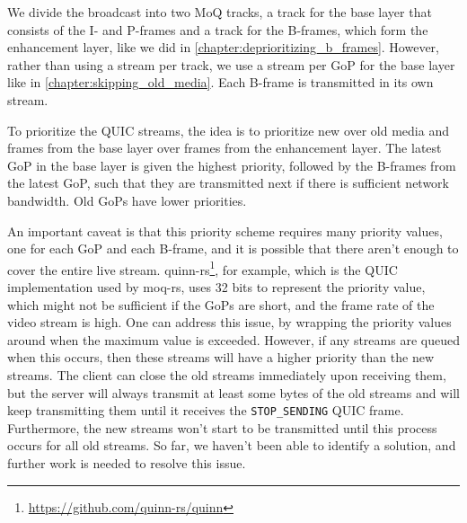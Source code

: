 We divide the broadcast into two \ac{MoQ} tracks, a track for the base layer that consists of the I- and P-frames and a track for the B-frames, which form the enhancement layer, like we did in \autoref{chapter:deprioritizing_b_frames}. However, rather than using a stream per track, we use a stream per \ac{GoP} for the base layer like in \autoref{chapter:skipping_old_media}. Each B-frame is transmitted in its own stream.

To prioritize the QUIC streams, the idea is to prioritize new over old media and frames from the base layer over frames from the enhancement layer. The latest \ac{GoP} in the base layer is given the highest priority, followed by the B-frames from the latest \ac{GoP}, such that they are transmitted next if there is sufficient network bandwidth. Old \acp{GoP} have lower priorities.


An important caveat is that this priority scheme requires many priority values, one for each \ac{GoP} and each B-frame, and it is possible that there aren't enough to cover the entire live stream. quinn-rs\footnote{\url{https://github.com/quinn-rs/quinn}}, for example, which is the QUIC implementation used by moq-rs, uses 32 bits to represent the priority value, which might not be sufficient if the \acp{GoP} are short, and the frame rate of the video stream is high. One can address this issue, by wrapping the priority values around when the maximum value is exceeded. However, if any streams are queued when this occurs, then these streams will have a higher priority than the new streams. The client can close the old streams immediately upon receiving them, but the server will always transmit at least some bytes of the old streams and will keep transmitting them until it receives the \lstinline{STOP_SENDING} QUIC frame. Furthermore, the new streams won't start to be transmitted until this process occurs for all old streams. So far, we haven't been able to identify a solution, and further work is needed to resolve this issue.